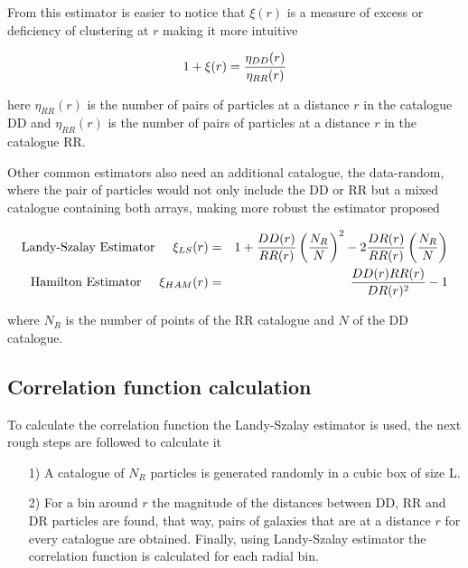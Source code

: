 From this estimator is easier to notice that $\xi(r)$ is a measure of 
excess or deficiency of clustering at $r$ making it more intuitive 

\[1+\xi(r)= \frac{\eta_{DD}(r)}{\eta_{RR}(r)}\]

here $\eta_{RR}(r)$ is the number of pairs of particles at a distance $r$ in the catalogue DD 
and $\eta_{RR}(r)$ is the number of pairs of particles at a distance $r$ in the catalogue RR. 

Other common estimators also need an additional catalogue, the data-random, where the
pair of particles would not only include the DD or RR but a mixed catalogue containing 
both arrays, making more robust the estimator proposed \cite{Est_CF}

\begin{eqnarray}
\mbox{Landy-Szalay Estimator}\hspace{0.5cm} \xi_{LS}(r)&=& 1+\frac{DD(r)}{RR(r)}\left(\frac{N_R}{N}\right)^2-2\frac{DR(r)}{RR(r)}\left(\frac{N_R}{N}\right) \nonumber \\
\mbox{Hamilton Estimator}  \hspace{0.5cm} \xi_{HAM}(r)&=&\frac{DD(r)RR(r)}{DR(r)^2}-1 \nonumber 
\end{eqnarray}

where $N_R$ is the number of points of the RR catalogue and $N$ of the DD catalogue.

\subsection{Correlation function calculation}

To calculate the correlation function the Landy-Szalay estimator is used, the next
rough steps are followed to calculate it

\begin{enumerate}

\item[1)] A catalogue of $N_R$ particles is generated randomly in a cubic box of size L.

\item[2)] For a bin around $r$ the magnitude of the distances between DD, RR and DR
particles are found, that way, pairs of galaxies that are at a distance $r$ for every 
catalogue are obtained. Finally, using Landy-Szalay estimator the correlation function 
is calculated for each radial bin. 

\end{enumerate}